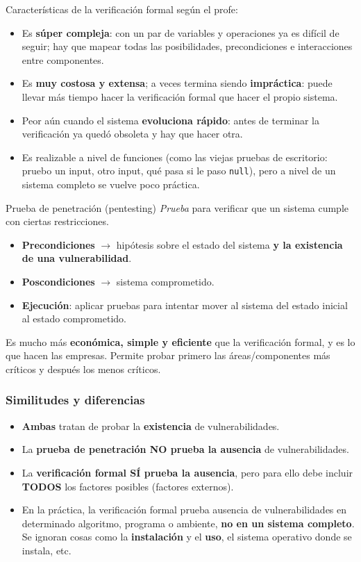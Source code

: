 \documentclass[../main.tex]{subfiles}
\begin{document}
Características de la verificación formal según el profe:
\begin{itemize}
    \item Es \textbf{súper compleja}: con un par de variables y operaciones ya es difícil
    de seguir; hay que mapear todas las posibilidades, precondiciones e interacciones
    entre componentes.
    \item Es \textbf{muy costosa y extensa}; a veces termina siendo \textbf{impráctica}:
    puede llevar más tiempo hacer la verificación formal que hacer el propio sistema.
    \item Peor aún cuando el sistema \textbf{evoluciona rápido}: antes de terminar la
    verificación ya quedó obsoleta y hay que hacer otra.
    \item Es realizable a nivel de funciones (como las viejas pruebas de escritorio:
    pruebo un input, otro input, qué pasa si le paso \texttt{null}), pero a nivel de un
    sistema completo se vuelve poco práctica.
\end{itemize}

\begin{definicion}{Prueba de penetración (pentesting)}
\emph{Prueba} para verificar que un sistema cumple con ciertas restricciones.
\begin{itemize}
    \item \textbf{Precondiciones} $\rightarrow$ hipótesis sobre el estado del sistema
    \textbf{y la existencia de una vulnerabilidad}.
    \item \textbf{Poscondiciones} $\rightarrow$ sistema comprometido.
    \item \textbf{Ejecución}: aplicar pruebas para intentar mover al sistema del estado
    inicial al estado comprometido.
\end{itemize}
Es mucho más \textbf{económica, simple y eficiente} que la verificación formal, y es lo
que hacen las empresas. Permite probar primero las áreas/componentes más críticos y
después los menos críticos.
\end{definicion}

\subsubsection*{Similitudes y diferencias}

\begin{itemize}
    \item \textbf{Ambas} tratan de probar la \textbf{existencia} de vulnerabilidades.
    \item La \textbf{prueba de penetración NO prueba la ausencia} de vulnerabilidades.
    \item La \textbf{verificación formal SÍ prueba la ausencia}, pero para ello debe
    incluir \textbf{TODOS} los factores posibles (factores externos).
    \item En la práctica, la verificación formal prueba ausencia de vulnerabilidades en
    determinado algoritmo, programa o ambiente, \textbf{no en un sistema completo}. Se
    ignoran cosas como la \textbf{instalación} y el \textbf{uso}, el sistema operativo
    donde se instala, etc.
\end{itemize}
\end{document}
